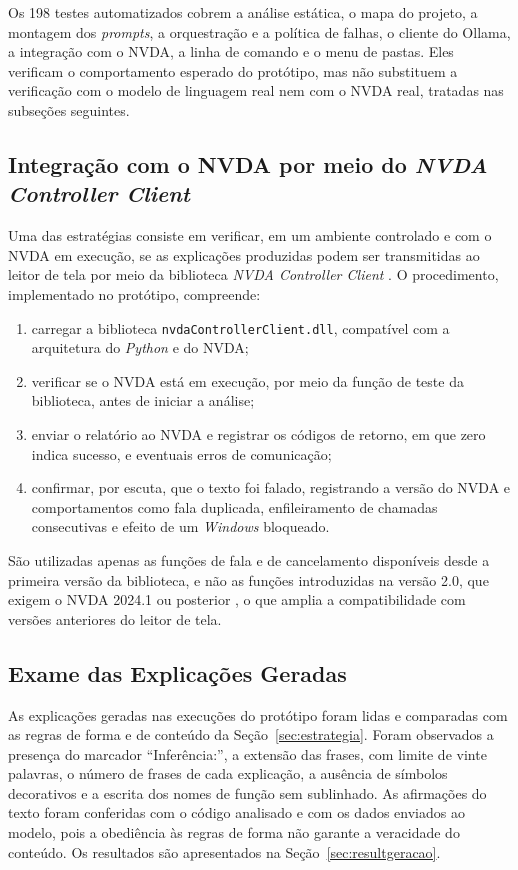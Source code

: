 \documentclass[
    12pt,                   %
    openright,              %
    oneside,                %
    a4paper,                %
    sumario=tradicional,    %
    english,                %
    brazil,                 %
    ]{abntex2}
\begin{document}
Os 198 testes automatizados cobrem a análise estática, o mapa do projeto, a montagem dos \textit{prompts}, a orquestração e a política de falhas, o cliente do Ollama, a integração com o NVDA, a linha de comando e o menu de pastas. Eles verificam o comportamento esperado do protótipo, mas não substituem a verificação com o modelo de linguagem real nem com o NVDA real, tratadas nas subseções seguintes.

\subsection{Integração com o NVDA por meio do \textit{NVDA Controller Client}}

Uma das estratégias consiste em verificar, em um ambiente controlado e com o NVDA em execução, se as explicações produzidas podem ser transmitidas ao leitor de tela por meio da biblioteca \textit{NVDA Controller Client} \cite{nvaccess2024controller}. O procedimento, implementado no protótipo, compreende:

\begin{enumerate}
  \item carregar a biblioteca \texttt{nvdaControllerClient.dll}, compatível com a arquitetura do \textit{Python} e do NVDA;
  \item verificar se o NVDA está em execução, por meio da função de teste da biblioteca, antes de iniciar a análise;
  \item enviar o relatório ao NVDA e registrar os códigos de retorno, em que zero indica sucesso, e eventuais erros de comunicação;
  \item confirmar, por escuta, que o texto foi falado, registrando a versão do NVDA e comportamentos como fala duplicada, enfileiramento de chamadas consecutivas e efeito de um \textit{Windows} bloqueado.
\end{enumerate}

São utilizadas apenas as funções de fala e de cancelamento disponíveis desde a primeira versão da biblioteca, e não as funções introduzidas na versão 2.0, que exigem o NVDA 2024.1 ou posterior \cite{nvaccess2024controller}, o que amplia a compatibilidade com versões anteriores do leitor de tela.

\subsection{Exame das Explicações Geradas}\label{sec:verificador}

As explicações geradas nas execuções do protótipo foram lidas e comparadas com as regras de forma e de conteúdo da Seção~\ref{sec:estrategia}. Foram observados a presença do marcador \enquote{Inferência:}, a extensão das frases, com limite de vinte palavras, o número de frases de cada explicação, a ausência de símbolos decorativos e a escrita dos nomes de função sem sublinhado. As afirmações do texto foram conferidas com o código analisado e com os dados enviados ao modelo, pois a obediência às regras de forma não garante a veracidade do conteúdo. Os resultados são apresentados na Seção~\ref{sec:resultgeracao}.
\end{document}
